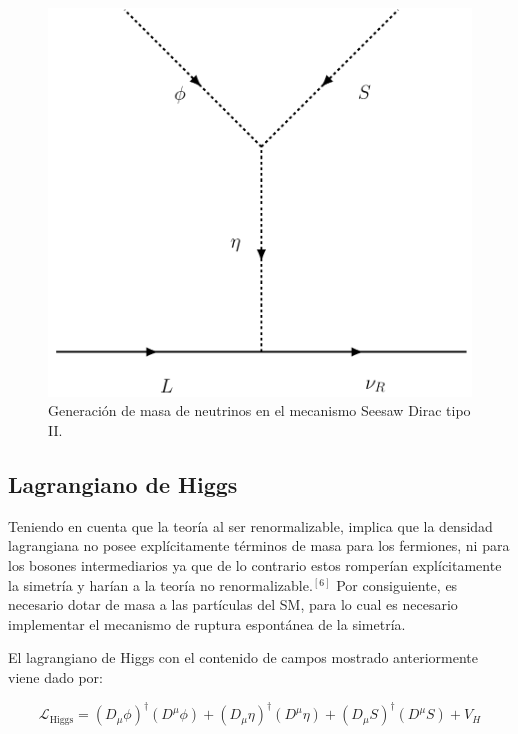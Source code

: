 \documentclass[12pt]{article}
\begin{document}
\begin{figure}[h!]
\begin{center}
\includegraphics[scale=0.5]{DiracSeeSAWFinally.pdf}
\caption{Generación de masa de neutrinos en el mecanismo Seesaw Dirac tipo II.}
\label{fig:FinallyDiagram}
\end{center}
\end{figure}


\subsection{Lagrangiano de Higgs}

Teniendo en cuenta que la teoría al ser renormalizable, implica que la densidad lagrangiana no posee explícitamente términos de masa para los fermiones, ni para los bosones intermediarios ya que de lo contrario estos romperían explícitamente la simetría y harían a la teoría no renormalizable.$^{[6]}$ Por consiguiente, es necesario dotar de masa a las partículas del SM, para lo cual es necesario implementar el mecanismo de ruptura espontánea de la simetría.

El lagrangiano de  Higgs con el contenido de campos mostrado anteriormente viene dado por:

\begin{equation}
    \mathcal{L}_{\text{Higgs}}= (D_\mu\phi)^\dagger(D^\mu\phi)+ (D_\mu\eta)^\dagger(D^\mu\eta) + (D_\mu S)^\dagger(D^\mu S) + V_H
    \label{eq:HiggsDirac}
\end{equation}\\
\end{document}
